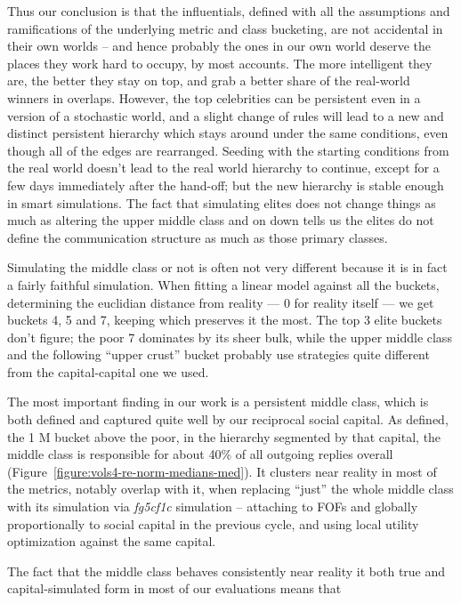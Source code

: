 \documentclass[10pt,oneside]{memoir}
\begin{document}
Thus our conclusion is that the influentials, defined with all the assumptions and ramifications of the underlying metric and class bucketing, are not accidental in their own worlds -- and hence probably the ones in our own world deserve the places they work hard to occupy, by most accounts.  The more intelligent they are, the better they stay on top, and grab a better share of the real-world winners in overlaps.  However, the top celebrities can be persistent even in a version of a stochastic world, and a slight change of rules will lead to a new and distinct persistent hierarchy which stays around under the same conditions, even though all of the edges are rearranged.  Seeding with the starting conditions from the real world doesn't lead to the real world hierarchy to continue, except for a few days immediately after the hand-off; but the new hierarchy is stable enough in smart simulations.
The fact that simulating elites does not change things as much as altering the upper middle class and on down tells us the elites do not define the communication structure as much as those primary classes.


Simulating the middle class or not is often not very different because it is in fact a fairly faithful simulation.  When fitting a linear model against all the buckets, determining the euclidian distance from reality --- 0 for reality itself --- we get buckets 4, 5 and 7, keeping which preserves it the most.  The top 3 elite buckets don't figure; the poor 7 dominates by its sheer bulk, while the upper middle class and the following ``upper crust'' bucket probably use strategies quite different from the capital-capital one we used.


The most important finding in our work is a persistent middle class, which is both defined and captured quite well by our reciprocal social capital.  As defined, the 1 M bucket above the poor, in the hierarchy segmented by that capital, the middle class is responsible for about 40\% of all outgoing replies overall (Figure~\ref{figure:vols4-re-norm-medians-med}).  It clusters near reality in most of the metrics, notably overlap with it, when replacing ``just'' the whole middle class with its simulation via {\itshape fg5cf1c} simulation -- attaching to FOFs and globally proportionally to social capital in the previous cycle, and using local utility optimization against the same capital.  


The fact that the middle class behaves consistently near reality it both true and capital-simulated form in most of our evaluations means that
\end{document}
